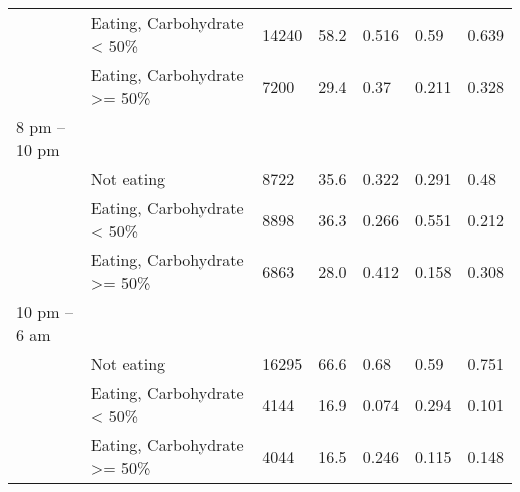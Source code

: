 \documentclass[11pt,a4paper]{article}
\begin{document}
\begin{table}
\begin{tabular}[t]{lllllll}
 & Eating, Carbohydrate < 50\% & 14240 & 58.2 & 0.516 & 0.59 & 0.639\\
 & Eating, Carbohydrate >= 50\% & 7200 & 29.4 & 0.37 & 0.211 & 0.328\\
8 pm – 10 pm &  &  &  &  &  & \\
 & Not eating & 8722 & 35.6 & 0.322 & 0.291 & 0.48\\
 & Eating, Carbohydrate < 50\% & 8898 & 36.3 & 0.266 & 0.551 & 0.212\\
 & Eating, Carbohydrate >= 50\% & 6863 & 28.0 & 0.412 & 0.158 & 0.308\\
10 pm – 6 am &  &  &  &  &  & \\
 & Not eating & 16295 & 66.6 & 0.68 & 0.59 & 0.751\\
 & Eating, Carbohydrate < 50\% & 4144 & 16.9 & 0.074 & 0.294 & 0.101\\
 & Eating, Carbohydrate >= 50\% & 4044 & 16.5 & 0.246 & 0.115 & 0.148\\
\bottomrule
\end{tabular}
\end{table}


\end{document}
